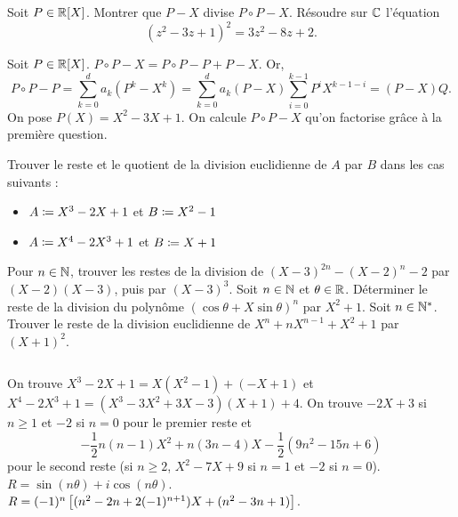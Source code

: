 \documentclass{magnolia}
\begin{document}


  \begin{questions}
  \question Soit $P\in\polyR$. Montrer que $P-X$ divise $P\circ P-X$.
  \question Résoudre sur $\mathbb{C}$ l'équation
    \[(z^2-3z+1)^2=3z^2-8z+2.\]
  \end{questions}
\begin{sol}
\begin{questions}
  \question Soit $P\in\polyR$. $P\circ P-X=P\circ P-P+P-X$. Or, 
  $$P\circ P-P=\sum_{k=0}^d a_k (P^k-X^k)=\sum_{k=0}^d a_k (P-X) \sum_{i=0}^{k-1}P^iX^{k-1-i}=(P-X)Q.$$
  \question On pose $P(X)=X^2-3X+1$. On calcule $P\circ P-X$ qu'on factorise grâce à la première question.
  \end{questions}
\end{sol}


\begin{questions}
\question Trouver le reste et le quotient de la division euclidienne de $A$ par
  $B$ dans les cas suivants :
  \begin{itemize}
  \item $A\coloneqq X^3-2X+1$ et $B\coloneqq X^2-1$
  \item $A\coloneqq X^4-2X^3+1$ et $B\coloneqq X+1$
  \end{itemize}
\question Pour $n\in\mathbb{N}$, trouver les restes de la division de $(X-3)^{2n}-(X-2)^{n}-2$ par
  $(X-2)(X-3)$, puis par $(X-3)^3$.
\question Soit $n\in\mathbb{N}$ et $\theta\in\mathbb{R}$. Déterminer le reste de la division
  du polynôme $(\cos\theta+X\sin\theta)^n$ par $X^2+1$.
\question Soit $n\in{\mathbb{N}^*}$. Trouver le reste de la division euclidienne de
  $X^n+nX^{n-1}+X^2+1$ par $(X+1)^2$.
\end{questions}
\begin{sol}
$\quad$
\begin{questions}
\question On trouve $X^3-2X+1=X(X^2-1)+(-X+1)$ et
  $X^4-2X^3+1=(X^3-3X^2+3X-3)(X+1)+4$.
\question On trouve $-2X+3$ si $n\geq 1$ et $-2$ si $n=0$ pour le premier
  reste et
  \[-\frac{1}{2}n(n-1)X^2+n(3n-4)X-\frac{1}{2}(9n^2-15n+6)\]
  pour le second reste (si $n\geq 2$, $X^2-7X+9$ si $n=1$ et $-2$ si $n=0$).
\question $R=\sin(n\theta)+i\cos(n\theta)$.
\question $R=(-1)^n \left[(n^2-2n+2(-1)^{n+1})X+(n^2-3n+1)\right]$.
\end{questions}
\end{sol}
\end{document}
